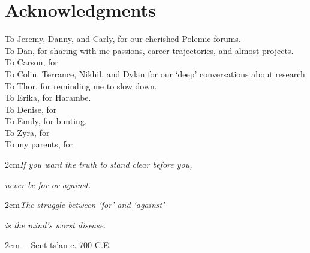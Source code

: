 \section*{Acknowledgments}
To Jeremy, Danny, and Carly, for our cherished Polemic forums.
\\To Dan, for sharing with me passions, career trajectories, and almost projects.
\\To Carson, for 
\\To Colin, Terrance, Nikhil, and Dylan for our `deep' conversations about research
\\To Thor, for reminding me to slow down.
\\To Erika, for Harambe.
\\To Denise, for 
\\To Emily, for bunting.
\\To Zyra, for 
\\To my parents, for
\vfill
\begin{singlespace}
\begin{addmargin}[2cm]  {2cm}\textit{If you want the truth to stand clear before you,}\end{addmargin}
\begin{addmargin}[2.5cm]{2cm}\textit{never be for or against.}\end{addmargin}
\begin{addmargin}[2cm]  {2cm}\textit{The struggle between `for' and `against'}\end{addmargin}
\begin{addmargin}[2.5cm]{2cm}\textit{is the mind's worst disease.}\end{addmargin}
\begin{addmargin}[2cm]  {2cm}\normalfont\flushright --- Sent-ts'an c. 700 C.E.\end{addmargin}
\end{singlespace}

